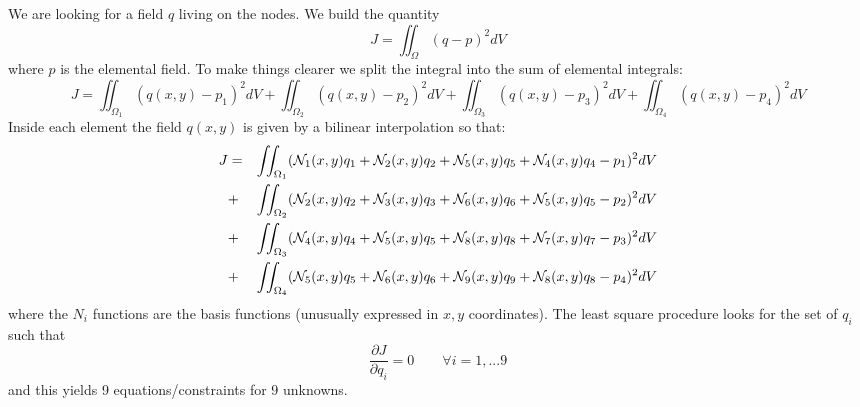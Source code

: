 We are looking for a field $q$ living on the nodes.
We build the quantity
\[
J=\iint_\Omega (q-p)^2 dV
\]
where $p$ is the elemental field. To make things clearer we split the integral into 
the sum of elemental integrals:
\[
J=
\iint_{\Omega_1} (q(x,y)-p_1)^2 dV+
\iint_{\Omega_2} (q(x,y)-p_2)^2 dV+
\iint_{\Omega_3} (q(x,y)-p_3)^2 dV+
\iint_{\Omega_4} (q(x,y)-p_4)^2 dV
\]
Inside each element the field $q(x,y)$ is given by a bilinear interpolation so that:
\begin{eqnarray}
J
&=& \iint_{\Omega_1} ({\mathcal{N}}_1(x,y) q_1 + {\mathcal{N}}_2(x,y)q_2 + {\mathcal{N}}_5(x,y)q_5 + {\mathcal{N}}_4(x,y)q_4 -p_1)^2 dV \nonumber\\
&+& \iint_{\Omega_2} ({\mathcal{N}}_2(x,y) q_2 + {\mathcal{N}}_3(x,y)q_3 + {\mathcal{N}}_6(x,y)q_6 + {\mathcal{N}}_5(x,y)q_5 -p_2)^2 dV \nonumber\\
&+& \iint_{\Omega_3} ({\mathcal{N}}_4(x,y) q_4 + {\mathcal{N}}_5(x,y)q_5 + {\mathcal{N}}_8(x,y)q_8 + {\mathcal{N}}_7(x,y)q_7 -p_3)^2 dV \nonumber\\
&+& \iint_{\Omega_4} ({\mathcal{N}}_5(x,y) q_5 + {\mathcal{N}}_6(x,y)q_6 + {\mathcal{N}}_9(x,y)q_9 + {\mathcal{N}}_8(x,y)q_8 -p_4)^2 dV 
\end{eqnarray}
where the $N_i$ functions are the basis functions (unusually expressed in $x,y$ coordinates).
The least square procedure looks for the set of $q_i$ such that 
\[
\frac{\partial J}{\partial q_i} =0 \qquad \forall i=1,...9
\]
and this yields 9 equations/constraints for 9 unknowns.
